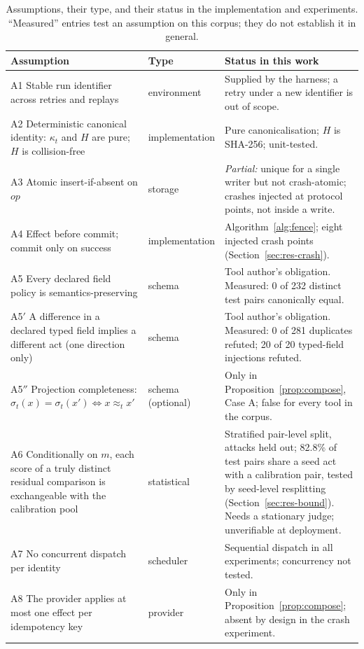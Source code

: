 \begin{table}[!tbp]
\centering\footnotesize\linespread{1.0}\selectfont\setlength{\tabcolsep}{4pt}
\caption{Assumptions, their type, and their status in the implementation and experiments. ``Measured'' entries test an assumption on this corpus; they do not establish it in general.}\label{tab:assumptions}
\begin{tabularx}{\linewidth}{@{}p{3.0cm}p{2.5cm}X@{}}
\toprule
Assumption & Type & Status in this work \\
\midrule
A1 Stable run identifier across retries and replays & environment & Supplied by the harness; a retry under a new identifier is out of scope. \\
A2 Deterministic canonical identity: $\kappa_t$ and $H$ are pure; $H$ is collision-free & implementation & Pure canonicalisation; $H$ is SHA-256; unit-tested. \\
A3 Atomic insert-if-absent on $\mathit{op}$ & storage & \emph{Partial:} unique for a single writer but not crash-atomic; crashes injected at protocol points, not inside a write. \\
A4 Effect before commit; commit only on success & implementation & Algorithm~\ref{alg:fence}; eight injected crash points (Section~\ref{sec:res-crash}). \\
A5 Every declared field policy is semantics-preserving & schema & Tool author's obligation. Measured: 0 of 232 distinct test pairs canonically equal. \\
A5$'$ A difference in a declared typed field implies a different act (one direction only) & schema & Tool author's obligation. Measured: 0 of 281 duplicates refuted; 20 of 20 typed-field injections refuted. \\
A5$''$ Projection completeness: $\sigma_t(x)=\sigma_t(x')\Leftrightarrow x\approx_t x'$ & schema (optional) & Only in Proposition~\ref{prop:compose}, Case A; false for every tool in the corpus. \\
A6 Conditionally on $m$, each score of a truly distinct residual comparison is exchangeable with the calibration pool & statistical & Stratified pair-level split, attacks held out; 82.8\% of test pairs share a seed act with a calibration pair, tested by seed-level resplitting (Section~\ref{sec:res-bound}). Needs a stationary judge; unverifiable at deployment. \\
A7 No concurrent dispatch per identity & scheduler & Sequential dispatch in all experiments; concurrency not tested. \\
A8 The provider applies at most one effect per idempotency key & provider & Only in Proposition~\ref{prop:compose}; absent by design in the crash experiment. \\
\bottomrule
\end{tabularx}
\end{table}

